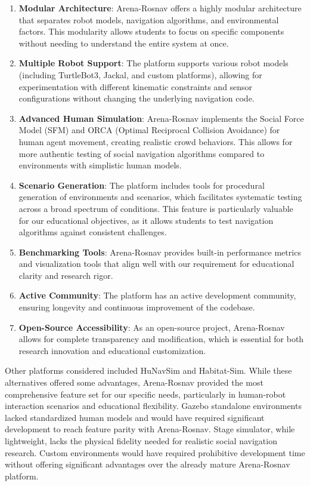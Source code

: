 \begin{enumerate}
\item \textbf{Modular Architecture}: Arena-Rosnav offers a highly modular architecture that separates robot 
models, navigation algorithms, and environmental factors. This modularity allows students to focus on specific 
components without needing to understand the entire system at once.
\item \textbf{Multiple Robot Support}: The platform supports various robot models (including TurtleBot3, 
Jackal, and custom platforms), allowing for experimentation with different kinematic constraints and 
sensor configurations without changing the underlying navigation code.

\item \textbf{Advanced Human Simulation}: Arena-Rosnav implements the Social Force Model (SFM) 
and ORCA (Optimal Reciprocal Collision Avoidance) for human agent movement, creating realistic crowd behaviors. 
This allows for more authentic testing of social navigation algorithms compared to environments with simplistic 
human models.

\item \textbf{Scenario Generation}: The platform includes tools for procedural generation of environments 
and scenarios, which facilitates systematic testing across a broad spectrum of conditions. This feature 
is particularly valuable for our educational objectives, as it allows students to test navigation algorithms 
against consistent challenges.

\item \textbf{Benchmarking Tools}: Arena-Rosnav provides built-in performance metrics and visualization 
tools that align well with our requirement for educational clarity and research rigor.

\item \textbf{Active Community}: The platform has an active development community, ensuring longevity 
and continuous improvement of the codebase.

\item \textbf{Open-Source Accessibility}: As an open-source project, Arena-Rosnav allows for complete 
transparency and modification, which is essential for both research innovation and educational customization.
\end{enumerate}
Other platforms considered included HuNavSim and Habitat-Sim. While these alternatives offered some advantages, 
Arena-Rosnav provided the most comprehensive 
feature set for our specific needs, particularly in human-robot interaction scenarios and educational 
flexibility. Gazebo standalone environments lacked standardized human models and would have required significant 
development to reach feature parity with Arena-Rosnav. Stage simulator, while lightweight, lacks the physical 
fidelity needed for realistic social navigation research. Custom environments would have required prohibitive 
development time without offering significant advantages over the already mature Arena-Rosnav platform.

